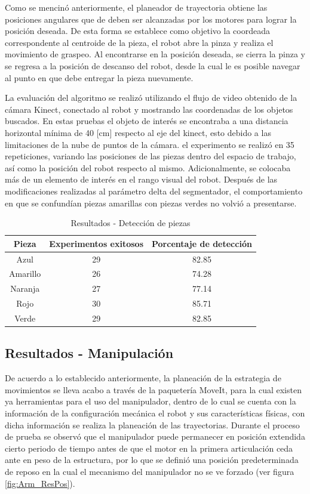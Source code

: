 Como se mencinó anteriormente, el planeador de trayectoria obtiene las posiciones angulares que de deben ser alcanzadas por los motores para lograr la posición deseada. De esta forma se establece como objetivo la coordeada correspondente al centroide de la pieza, el robot abre la pinza y realiza el movimiento de graspeo. Al encontrarse en la posición deseada, se cierra la pinza y se regresa a la posición de descanso del robot, desde la cual le es posible navegar al punto en que debe entregar la pieza nuevamente.

La evaluación del algoritmo se realizó utilizando el flujo de video obtenido de la cámara Kinect, conectado al robot y mostrando las coordenadas de los objetos buscados. En estas pruebas el objeto de interés se encontraba a una distancia horizontal mínima de 40 [cm] respecto al eje del kinect, esto debido a las limitaciones de la nube de puntos de la cámara. el experimento se realizó en 35 repeticiones, variando las posiciones de las piezas dentro del espacio de trabajo, así como la posición del robot respecto al mismo. Adicionalmente, se colocaba más de un elemento de interés en el rango visual del robot. Después de las modificaciones realizadas al parámetro delta del segmentador, el comportamiento en que se confundían piezas amarillas con piezas verdes no volvió a presentarse.

\begin{table}
    \centering
    \begin{tabular}{|c|c|c|}
    \hline
        \textbf{Pieza} & \textbf{Experimentos exitosos} & \textbf{Porcentaje de detección}\\
    \hline
        Azul & 29 & 82.85\\
    \hline
        Amarillo & 26 & 74.28\\
    \hline
        Naranja & 27 & 77.14 \\
    \hline
        Rojo & 30 & 85.71 \\
    \hline
        Verde & 29 & 82.85 \\
    \hline
    \end{tabular}
    \caption{Resultados - Detección de piezas}
    \label{tab:Res-Vis}
\end{table}

\newpage

\subsection{Resultados - Manipulación}
De acuerdo a lo establecido anteriormente, la planeación de la estrategia de movimientos se lleva acabo a través de la paquetería MoveIt, para la cual existen ya herramientas para el uso del manipulador, dentro de lo cual se cuenta con la información de la configuración mecánica el robot y sus características físicas, con dicha información se realiza la planeación de las trayectorias. Durante el proceso de prueba se observó que el manipulador puede permanecer en posición extendida cierto periodo de tiempo antes de que el motor en la primera articulación ceda ante en peso de la estructura, por lo que se definió una posición predeterminada de reposo en la cual el mecanismo del manipulador no se ve forzado (ver figura \ref{fig:Arm_ResPos}).

